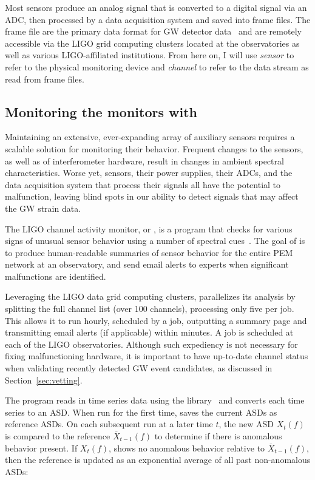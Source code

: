 Most sensors produce an analog signal that is converted to a digital signal via an \ac{ADC}, then processed by a data acquisition system and saved into frame files.
The frame file are the primary data format for \ac{GW} detector data~\citep{frame_file} and are remotely accessible via the \ac{LIGO} grid computing clusters located at the observatories as well as various \ac{LIGO}-affiliated institutions.
From here on, I will use \textit{sensor} to refer to the physical monitoring device and \textit{channel} to refer to the data stream as read from frame files.

\subsection{Monitoring the monitors with \ligocam}\label{sec:ligocam}

Maintaining an extensive, ever-expanding array of auxiliary sensors requires a scalable solution for monitoring their behavior.
Frequent changes to the sensors, as well as of interferometer hardware, result in changes in ambient spectral characteristics.
Worse yet, sensors, their power supplies, their \acp{ADC}, and the data acquisition system that process their signals all have the potential to malfunction, leaving blind spots in our ability to detect signals that may affect the \ac{GW} strain data.

The \ac{LIGO} channel activity monitor, or \ligocam, is a program that checks for various signs of unusual sensor behavior using a number of spectral cues~\citep{ligocam}.
The goal of \ligocam is to produce human-readable summaries of sensor behavior for the entire \ac{PEM} network at an observatory, and send email alerts to experts when significant malfunctions are identified.

Leveraging the \ac{LIGO} data grid computing clusters, \ligocam parallelizes its analysis by splitting the full channel list (over 100 channels), processing only five per job.
This allows it to run hourly, scheduled by a  job, outputting a summary page and transmitting email alerts (if applicable) within minutes.
A  job is scheduled at each of the \ac{LIGO} observatories.
Although such expediency is not necessary for fixing malfunctioning hardware, it is important to have up-to-date channel status when validating recently detected \ac{GW} event candidates, as discussed in Section~\ref{sec:vetting}.

The program reads in time series data using the  library~\citep{gwpy} and converts each time series to an \ac{ASD}.
When run for the first time, \ligocam saves the current \acp{ASD} as reference \acp{ASD}.
On each subsequent run at a later time $t$, the new \ac{ASD} $X_t(f)$ is compared to the reference $\overline{X}_{t-1}(f)$ to determine if there is anomalous behavior present.
If $X_t(f)$, shows no anomalous behavior relative to $\overline{X}_{t-1}(f)$, then the reference is updated as an exponential average of all past non-anomalous \acp{ASD}:

